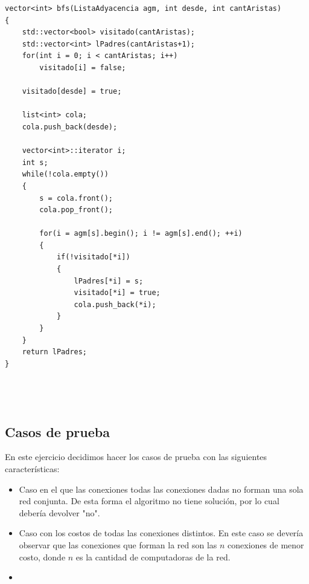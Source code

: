 \begin{lstlisting}
vector<int> bfs(ListaAdyacencia agm, int desde, int cantAristas)
{
    std::vector<bool> visitado(cantAristas);
    std::vector<int> lPadres(cantAristas+1);
    for(int i = 0; i < cantAristas; i++)
        visitado[i] = false;
 
    visitado[desde] = true;

    list<int> cola;
    cola.push_back(desde);
 
    vector<int>::iterator i;
    int s;
    while(!cola.empty())
    {
        s = cola.front();
        cola.pop_front();

        for(i = agm[s].begin(); i != agm[s].end(); ++i)
        {
            if(!visitado[*i])
            {
                lPadres[*i] = s;
                visitado[*i] = true;
                cola.push_back(*i);
            }
        }
    }
    return lPadres;
}




\end{lstlisting}


\newpage


\subsection{Casos de prueba}

En este ejercicio decidimos hacer los casos de prueba con las siguientes caracter\'isticas:

\begin{itemize}
\item Caso en el que las conexiones todas las conexiones dadas no forman una sola red conjunta. De esta forma el algoritmo no tiene solución, por lo cual debería devolver "no".
\item Caso con los costos de todas las conexiones distintos. En este caso se devería observar que las conexiones que forman la red son las $n$ conexiones de menor costo, donde $n$ es la cantidad de computadoras de la red.
\item 
\end{itemize}


\newpage


